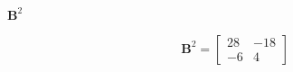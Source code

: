 $\boldsymbol{B}^2$

\begin{solution}
\begin{align*}
    \boldsymbol{B}^2= \begin{bmatrix}
    28 & -18 \\ -6 & 4
    \end{bmatrix}
\end{align*}
\end{solution}